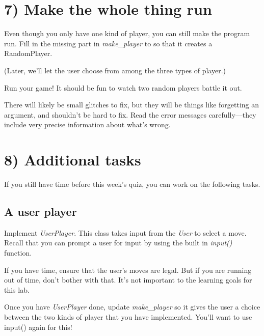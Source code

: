 \documentclass[12pt]{article}
\begin{document}
\section*{7) Make the whole thing run}

\bigskip

Even though you only have one kind of player, you can still make the program run.
Fill in the missing part in \textit{make\_player} to so that it creates a RandomPlayer.

\bigskip

\noindent (Later, we’ll let the user choose from among the three types of player.)

\bigskip

\noindent Run your game! It should be fun to watch two random players battle it out.

\bigskip

\noindent There will likely be small glitches to fix, but they will be things like forgetting an argument, and shouldn’t be hard to fix. Read the error messages carefully—they include very precise information about what’s wrong.

\bigskip

\section*{8) Additional tasks}

\bigskip

If you still have time before this week’s quiz, you can work on the following tasks.

\bigskip

\subsection*{A user player}

\bigskip

\noindent Implement \textit{UserPlayer}. This class takes input from the \textit{User} to
select a move. Recall that you can prompt a user for input by using the built in
\textit{input()} function.

\bigskip

\noindent If you have time, ensure that the user’s moves are legal. But if you are running out of time, don’t bother
with that. It’s not important to the learning goals for this lab.

\bigskip

\noindent Once you have \textit{UserPlayer} done, update \textit{make\_player}
so it gives the user a choice between the two kinds of player that you have
implemented. You'll want to use input() again for this!
\end{document}
